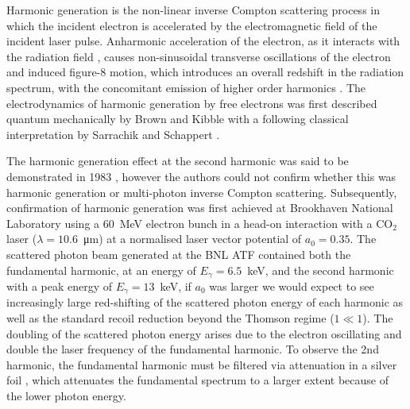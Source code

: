 \documentclass[../main.tex]{subfiles}
\begin{document}
Harmonic generation is the non-linear inverse Compton scattering process in which the incident electron is accelerated by the electromagnetic field of the incident laser pulse. Anharmonic acceleration of the electron, as it interacts with the radiation field \cite{englert1983second}, causes non-sinusoidal transverse oscillations of the electron and induced figure-8 motion, which introduces an overall redshift in the radiation
spectrum, with the concomitant emission of higher order harmonics \cite{sakai2015observation}. The electrodynamics of harmonic generation by free electrons was first described quantum mechanically by Brown and Kibble \cite{brown1964interaction,kibble1965frequency} with a following classical interpretation by Sarrachik and Schappert \cite{sarachik1970classical}. 

The harmonic generation effect at the second harmonic was said to be demonstrated in 1983 \cite{englert1983second}, however the authors could not confirm whether this was harmonic generation or multi-photon inverse Compton scattering. Subsequently, confirmation of harmonic generation was first achieved at Brookhaven National Laboratory \cite{babzien2006observation,kumita2006observation} using a 60~\si{\mega\electronvolt} electron bunch in a head-on interaction with a CO$_{2}$ laser ($\lambda = 10.6$~\si{\micro\meter}) at a normalised laser vector potential of $a_{0} = 0.35$. The scattered photon beam generated at the BNL ATF contained both the fundamental harmonic, at an energy of $E_{\gamma} = 6.5$~\si{\kilo\electronvolt}, and the second harmonic with a peak energy of $E_{\gamma} = 13$~\si{\kilo\electronvolt}, if $a_{0}$ was larger we would expect to see increasingly large red-shifting of the scattered photon energy of each harmonic \cite{kibble1965frequency,sakai2015observation} as well as the standard recoil reduction beyond the Thomson regime ($1 \ll 1$). The doubling of the scattered photon energy arises due to the electron oscillating and double the laser frequency of the fundamental harmonic. To observe the 2nd harmonic, the fundamental harmonic must be filtered via attenuation in a silver foil \cite{babzien2006observation}, which attenuates the fundamental spectrum to a larger extent because of the lower photon energy.
\end{document}
